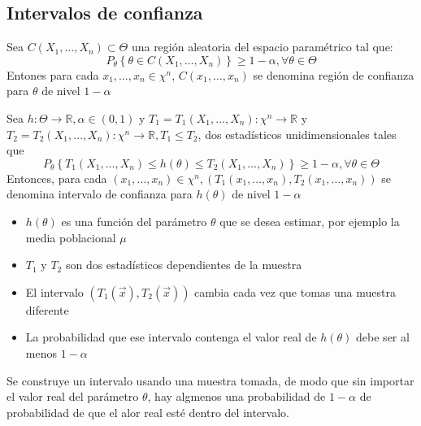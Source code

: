 \subsection{Intervalos de confianza}
\begin{definición}
    Sea $C(X_{1}, \ldots, X_{n}) \subset \Theta$ una región aleatoria del espacio paramétrico tal que: 
    $$P_{\theta}\left\{\theta \in C(X_{1}, \ldots, X_{n})\right\} \geq 1-\alpha, \forall \theta \in \Theta$$
    Entones para cada $x_{1}, \ldots, x_{n} \in \chi^{n}$, $C(x_{1}, \ldots, x_{n})$ se denomina región de confianza para $\theta$ de nivel $1-\alpha$
\end{definición}


\begin{definición}
Sea $h: \Theta \rightarrow \mathbb{R}, \alpha \in(0,1)$ y $T_{1}=T_{1}\left(X_{1}, \ldots, X_{n}\right): \chi^{n} \rightarrow \mathbb{R}$ y $T_{2}=T_{2}\left(X_{1}, \ldots, X_{n}\right): \chi^{n} \rightarrow \mathbb{R}, T_{1} \leq T_{2}$, dos estadísticos unidimensionales tales que
$$P_{\theta}\left\{T_{1}\left(X_{1}, \ldots, X_{n}\right) \leq h(\theta) \leq T_{2}\left(X_{1}, \ldots, X_{n}\right)\right\} \geq 1-\alpha, \forall \theta \in \Theta$$
Entonces, para cada $\left(x_{1}, \ldots, x_{n}\right) \in \chi^{n},\left(T_{1}\left(x_{1}, \ldots, x_{n}\right), T_{2}\left(x_{1}, \ldots, x_{n}\right)\right)$ se denomina intervalo de confianza para $h(\theta)$ de nivel $1-\alpha$
\end{definición}

\begin{observación}
    \vspace{-\topsep}
    \vspace{-\topsep}
    \begin{itemize}
        \item $h(\theta)$ es una función del parámetro $\theta$ que se desea estimar, por ejemplo la media poblacional $\mu$
        \item $T_{1}$ y $T_{2}$ son dos estadísticos dependientes de la muestra
        \item El intervalo $(T_{1}(\vec{x}), T_{2}(\vec{x}))$ cambia cada vez que tomas una muestra diferente
        \item La probabilidad que ese intervalo contenga el valor real de $h(\theta)$ debe ser al menos $1-\alpha$
    \end{itemize}
    Se construye un intervalo usando una muestra tomada, de modo que sin importar el valor real del parámetro $\theta$, hay algmenos una probabilidad de $1-\alpha$ de probabilidad de que el alor real esté dentro del intervalo.
\end{observación}

